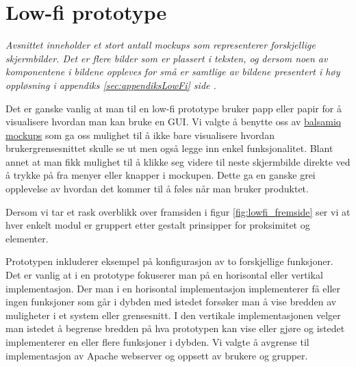 \section{Low-fi prototype} \label{sec:lowfi}
\emph{Avsnittet inneholder et stort antall mockups som representerer forskjellige skjermbilder. Det er flere bilder som er plassert i teksten, og dersom noen av komponentene i bildene oppleves for små er samtlige av bildene presentert i høy oppløsning i appendiks \ref{sec:appendiksLowFi} side \pageref{sec:appendiksLowFi}.}

Det er ganske vanlig at man til en low-fi prototype bruker papp eller papir for å visualisere hvordan man kan bruke en GUI. Vi valgte å benytte oss av \href{http://balsamiq.com/products/mockups/}{balsamiq mockups} som ga oss mulighet til å ikke bare visualisere hvordan brukergrensesnittet skulle se ut men også legge inn enkel funksjonalitet. Blant annet at man fikk mulighet til å klikke seg videre til neste skjermbilde direkte ved å trykke på fra menyer eller knapper i mockupen. Dette ga en ganske grei opplevelse av hvordan det kommer til å føles når man bruker produktet.


Dersom vi tar et rask overblikk over framsiden i figur \ref{fig:lowfi_fremside} ser vi at hver enkelt modul er gruppert etter gestalt prinsipper for proksimitet og elementer.\cite{forelesning:tulpesh}

Prototypen inkluderer eksempel på konfigurasjon av to forskjellige funksjoner.
Det er vanlig at i en prototype fokuserer man på en horisontal eller vertikal implementasjon. Der man i en horisontal implementasjon implementerer få eller ingen funksjoner som går i dybden med istedet forsøker man å vise bredden av muligheter i et system eller grensesnitt. I den vertikale implementasjonen velger man istedet å begrense bredden på hva prototypen kan vise eller gjøre og istedet implementerer en eller flere funksjoner i dybden.\cite{book:utforming}
Vi valgte å avgrense til implementasjon av Apache webserver og oppsett av brukere og grupper. 

